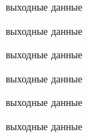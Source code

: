 \documentclass[12pt,a4paper]{article} %
\begin{document}




\begin{center}
выходные данные

выходные данные

выходные данные

выходные данные

выходные данные

выходные данные
\end{center}
\end{document}
